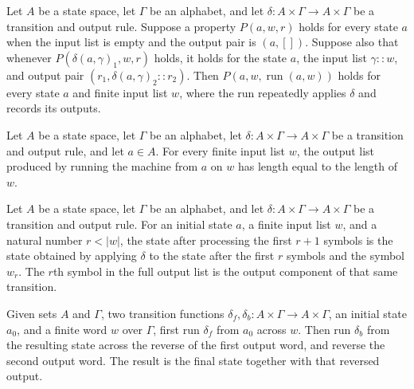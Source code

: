 \begin{theorem}
\label{Turing.mealyRun_induction}
\leanok
{}
Let $A$ be a state space, let $\Gamma$ be an alphabet, and let $\delta:A\times\Gamma\to
A\times\Gamma$ be a transition and output rule. Suppose a property $P(a,w,r)$ holds for
every state $a$ when the input list is empty and the output pair is $(a,[])$. Suppose
also that whenever $P(\delta(a,\gamma)_1,w,r)$ holds, it holds for the state $a$, the
input list $\gamma::w$, and output pair $(r_1,\delta(a,\gamma)_2::r_2)$. Then
$P(a,w,\operatorname{run}(a,w))$ holds for every state $a$ and finite input list $w$,
where the run repeatedly applies $\delta$ and records its outputs.
\end{theorem}

\begin{theorem}
\label{Turing.mealyRun_length}
\leanok
{}
Let $A$ be a state space, let $\Gamma$ be an alphabet, let $\delta:A\times\Gamma\to
A\times\Gamma$ be a transition and output rule, and let $a\in A$. For every finite input
list $w$, the output list produced by running the machine from $a$ on $w$ has length
equal to the length of $w$.
\end{theorem}

\begin{theorem}
\label{Turing.mealyRun_next}
\leanok
{}
Let $A$ be a state space, let $\Gamma$ be an alphabet, and let $\delta:A\times\Gamma\to
A\times\Gamma$ be a transition and output rule. For an initial state $a$, a finite input
list $w$, and a natural number $r<|w|$, the state after processing the first $r+1$
symbols is the state obtained by applying $\delta$ to the state after the first $r$
symbols and the symbol $w_r$. The $r$th symbol in the full output list is the output
component of that same transition.
\end{theorem}

\begin{definition}
\label{Turing.scanResult}
\leanok
{}
Given sets $A$ and $\Gamma$, two transition functions
$\delta_f,\delta_b:A\times\Gamma\to A\times\Gamma$, an initial state $a_0$, and a finite
word $w$ over $\Gamma$, first run $\delta_f$ from $a_0$ across $w$. Then run $\delta_b$
from the resulting state across the reverse of the first output word, and reverse the
second output word. The result is the final state together with that reversed output.
\end{definition}

